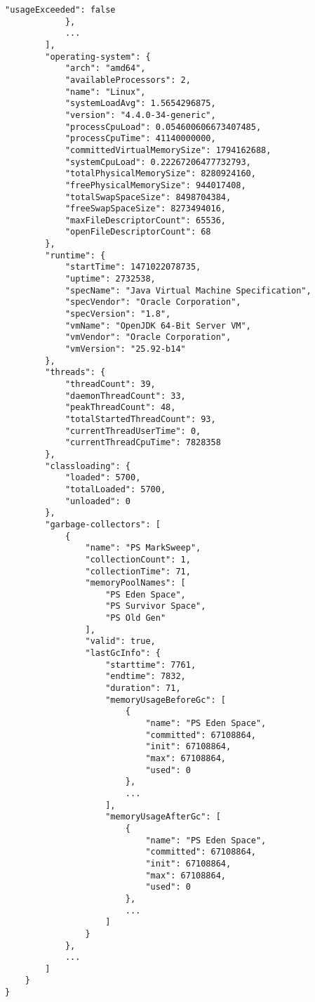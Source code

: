 \begin{lstlisting}[caption={"JvmCollector" JSON result, abbreviated}, captionpos=b, label={lst:json-jvm}]
                "usageExceeded": false
            },
            ...
        ],
        "operating-system": {
            "arch": "amd64",
            "availableProcessors": 2,
            "name": "Linux",
            "systemLoadAvg": 1.5654296875,
            "version": "4.4.0-34-generic",
            "processCpuLoad": 0.054600606673407485,
            "processCpuTime": 41140000000,
            "committedVirtualMemorySize": 1794162688,
            "systemCpuLoad": 0.22267206477732793,
            "totalPhysicalMemorySize": 8280924160,
            "freePhysicalMemorySize": 944017408,
            "totalSwapSpaceSize": 8498704384,
            "freeSwapSpaceSize": 8273494016,
            "maxFileDescriptorCount": 65536,
            "openFileDescriptorCount": 68
        },
        "runtime": {
            "startTime": 1471022078735,
            "uptime": 2732538,
            "specName": "Java Virtual Machine Specification",
            "specVendor": "Oracle Corporation",
            "specVersion": "1.8",
            "vmName": "OpenJDK 64-Bit Server VM",
            "vmVendor": "Oracle Corporation",
            "vmVersion": "25.92-b14"
        },
        "threads": {
            "threadCount": 39,
            "daemonThreadCount": 33,
            "peakThreadCount": 48,
            "totalStartedThreadCount": 93,
            "currentThreadUserTime": 0,
            "currentThreadCpuTime": 7828358
        },
        "classloading": {
            "loaded": 5700,
            "totalLoaded": 5700,
            "unloaded": 0
        },
        "garbage-collectors": [
            {
                "name": "PS MarkSweep",
                "collectionCount": 1,
                "collectionTime": 71,
                "memoryPoolNames": [
                    "PS Eden Space",
                    "PS Survivor Space",
                    "PS Old Gen"
                ],
                "valid": true,
                "lastGcInfo": {
                    "starttime": 7761,
                    "endtime": 7832,
                    "duration": 71,
                    "memoryUsageBeforeGc": [
                        {
                            "name": "PS Eden Space",
                            "committed": 67108864,
                            "init": 67108864,
                            "max": 67108864,
                            "used": 0
                        },
                        ...
                    ],
                    "memoryUsageAfterGc": [
                        {
                            "name": "PS Eden Space",
                            "committed": 67108864,
                            "init": 67108864,
                            "max": 67108864,
                            "used": 0
                        },
                        ...
                    ]
                }
            },
            ...
        ]
    }
}
\end{lstlisting}

